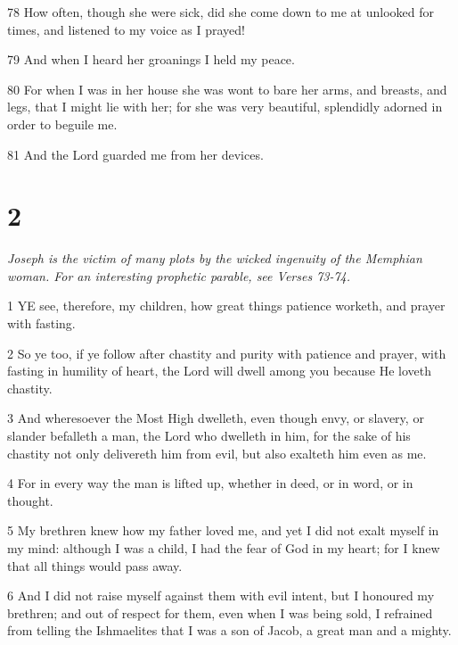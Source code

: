 \par 78 How often, though she were sick, did she come down to me at unlooked for times, and listened to my voice as I prayed!

\par 79 And when I heard her groanings I held my peace.

\par 80 For when I was in her house she was wont to bare her arms, and breasts, and legs, that I might lie with her; for she was very beautiful, splendidly adorned in order to beguile me.

\par 81 And the Lord guarded me from her devices.

\chapter{2}

\par \textit{Joseph is the victim of many plots by the wicked ingenuity of the Memphian woman. For an interesting prophetic parable, see Verses 73-74.}

\par 1 YE see, therefore, my children, how great things patience worketh, and prayer with fasting.

\par 2 So ye too, if ye follow after chastity and purity with patience and prayer, with fasting in humility of heart, the Lord will dwell among you because He loveth chastity.

\par 3 And wheresoever the Most High dwelleth, even though envy, or slavery, or slander befalleth a man, the Lord who dwelleth in him, for the sake of his chastity not only delivereth him from evil, but also exalteth him even as me.

\par 4 For in every way the man is lifted up, whether in deed, or in word, or in thought.

\par 5 My brethren knew how my father loved me, and yet I did not exalt myself in my mind: although I was a child, I had the fear of God in my heart; for I knew that all things would pass away.

\par 6 And I did not raise myself against them with evil intent, but I honoured my brethren; and out of respect for them, even when I was being sold, I refrained from telling the Ishmaelites that I was a son of Jacob, a great man and a mighty.

